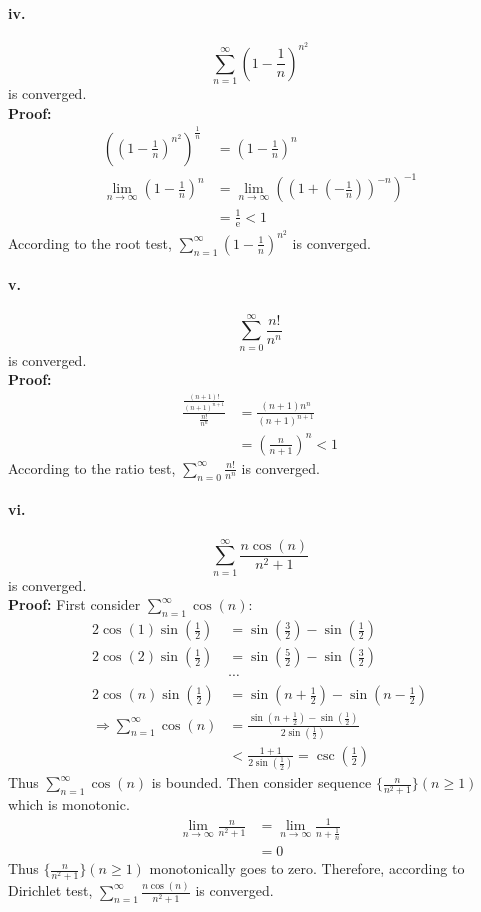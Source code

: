 \documentclass[11pt, a4paper]{article}
\begin{document}
\paragraph{iv.}
$$\sum\limits_{n = 1}^\infty (1 - \frac{1}{n})^{n^2}$$
is converged. \\
\textbf{Proof:}
$$\begin{aligned}
    ((1 - \frac{1}{n})^{n^2})^{\frac{1}{n}} &= (1 - \frac{1}{n})^n \\
    \lim\limits_{n \to \infty} (1 - \frac{1}{n})^n &= \lim\limits_{n \to \infty} ((1 + (-\frac{1}{n}))^{-n})^{-1} \\
    &= \frac{1}{\mathrm{e}} < 1
\end{aligned}$$
According to the root test, $\sum\limits_{n = 1}^\infty (1 - \frac{1}{n})^{n^2}$ is converged.

\paragraph{v.}
$$\sum\limits_{n=0}^\infty \frac{n!}{n^n}$$
is converged. \\
\textbf{Proof:}
$$\begin{aligned}
    \frac{\frac{(n + 1)!}{(n+1)^{n+1}}}{\frac{n!}{n^n}} &= \frac{(n + 1)n^n}{(n+1)^{n+1}} \\
    &= (\frac{n}{n+1})^n < 1
\end{aligned}$$
According to the ratio test, $\sum\limits_{n=0}^\infty \frac{n!}{n^n}$ is converged.

\paragraph{vi.} 
$$\sum\limits_{n=1}^\infty \frac{n\cos(n)}{n^2+1}$$
is converged. \\
\textbf{Proof:} First consider $\sum\limits_{n=1}^\infty \cos(n)$:
$$\begin{aligned}
    2\cos(1)\sin(\frac{1}{2}) &= \sin(\frac{3}{2}) - \sin(\frac{1}{2}) \\
    2\cos(2)\sin(\frac{1}{2}) &= \sin(\frac{5}{2}) - \sin(\frac{3}{2}) \\
    &\cdots \\
    2\cos(n)\sin(\frac{1}{2}) &= \sin(n + \frac{1}{2}) - \sin(n - \frac{1}{2}) \\
    \Rightarrow \sum\limits_{n=1}^\infty \cos(n) &= \frac{\sin(n+\frac{1}{2}) - \sin(\frac{1}{2})}{2\sin(\frac{1}{2})} \\
    &< \frac{1 + 1}{2\sin(\frac{1}{2})} = \csc(\frac{1}{2})
\end{aligned}$$
Thus $\sum\limits_{n=1}^\infty \cos(n)$ is bounded. Then consider sequence $\{\frac{n}{n^2+1}\} (n \geq 1)$ which is monotonic.
$$\begin{aligned}
    \lim\limits_{n \to \infty} \frac{n}{n^2+1} &= \lim\limits_{n \to \infty} \frac{1}{n + \frac{1}{n}} \\
    &= 0
\end{aligned}$$
Thus $\{\frac{n}{n^2+1}\} (n \geq 1)$ monotonically goes to zero. Therefore, according to Dirichlet test, $\sum\limits_{n=1}^\infty \frac{n\cos(n)}{n^2+1}$ is converged.
\end{document}
